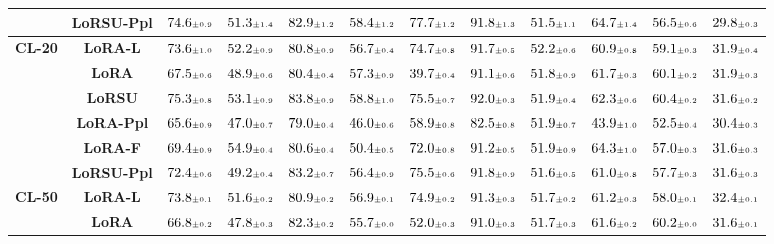 \begin{table}
\begin{center}
\begin{small}
\begin{tabular}{l c c c c c c c c c c c}
& \textbf{LoRSU-Ppl} & $74.6 \mtiny{\pm 0.9}$ & $51.3 \mtiny{\pm 1.4}$ & $82.9 \mtiny{\pm 1.2}$ & $58.4 \mtiny{\pm 1.2}$ & $77.7 \mtiny{\pm 1.2}$ & $91.8 \mtiny{\pm 1.3}$ & $51.5 \mtiny{\pm 1.1}$ & $64.7 \mtiny{\pm 1.4}$ & $56.5 \mtiny{\pm 0.6}$ & $29.8 \mtiny{\pm 0.3}$ \\
\midrule
\multirow{6}{*}{\textbf{CL-20}} & \textbf{LoRA-L} & $73.6 \mtiny{\pm 1.0}$ & $52.2 \mtiny{\pm 0.9}$ & $80.8 \mtiny{\pm 0.9}$ & $56.7 \mtiny{\pm 0.4}$ & $74.7 \mtiny{\pm 0.8}$ & $91.7 \mtiny{\pm 0.5}$ & $52.2 \mtiny{\pm 0.6}$ & $60.9 \mtiny{\pm 0.8}$ & $59.1 \mtiny{\pm 0.3}$ & $31.9 \mtiny{\pm 0.4}$ \\
& \textbf{LoRA} & $67.5 \mtiny{\pm 0.6}$ & $48.9 \mtiny{\pm 0.6}$ & $80.4 \mtiny{\pm 0.4}$ & $57.3 \mtiny{\pm 0.9}$ & $39.7 \mtiny{\pm 0.4}$ & $91.1 \mtiny{\pm 0.6}$ & $51.8 \mtiny{\pm 0.9}$ & $61.7 \mtiny{\pm 0.3}$ & $60.1 \mtiny{\pm 0.2}$ & $31.9 \mtiny{\pm 0.3}$ \\
& \textbf{LoRSU} & $75.3 \mtiny{\pm 0.8}$ & $53.1 \mtiny{\pm 0.9}$ & $83.8 \mtiny{\pm 0.9}$ & $58.8 \mtiny{\pm 1.0}$ & $75.5 \mtiny{\pm 0.7}$ & $92.0 \mtiny{\pm 0.3}$ & $51.9 \mtiny{\pm 0.4}$ & $62.3 \mtiny{\pm 0.6}$ & $60.4 \mtiny{\pm 0.2}$ & $31.6 \mtiny{\pm 0.2}$ \\
& \textbf{LoRA-Ppl} & $65.6 \mtiny{\pm 0.9}$ & $47.0 \mtiny{\pm 0.7}$ & $79.0 \mtiny{\pm 0.4}$ & $46.0 \mtiny{\pm 0.6}$ & $58.9 \mtiny{\pm 0.8}$ & $82.5 \mtiny{\pm 0.8}$ & $51.9 \mtiny{\pm 0.7}$ & $43.9 \mtiny{\pm 1.0}$ & $52.5 \mtiny{\pm 0.4}$ & $30.4 \mtiny{\pm 0.3}$ \\
& \textbf{LoRA-F} & $69.4 \mtiny{\pm 0.9}$ & $54.9 \mtiny{\pm 0.4}$ & $80.6 \mtiny{\pm 0.4}$ & $50.4 \mtiny{\pm 0.5}$ & $72.0 \mtiny{\pm 0.8}$ & $91.2 \mtiny{\pm 0.5}$ & $51.9 \mtiny{\pm 0.9}$ & $64.3 \mtiny{\pm 1.0}$ & $57.0 \mtiny{\pm 0.3}$ & $31.6 \mtiny{\pm 0.3}$ \\
& \textbf{LoRSU-Ppl} & $72.4 \mtiny{\pm 0.6}$ & $49.2 \mtiny{\pm 0.4}$ & $83.2 \mtiny{\pm 0.7}$ & $56.4 \mtiny{\pm 0.9}$ & $75.5 \mtiny{\pm 0.6}$ & $91.8 \mtiny{\pm 0.9}$ & $51.6 \mtiny{\pm 0.5}$ & $61.0 \mtiny{\pm 0.8}$ & $57.7 \mtiny{\pm 0.3}$ & $31.6 \mtiny{\pm 0.3}$ \\
\midrule
\multirow{6}{*}{\textbf{CL-50}} & \textbf{LoRA-L} & $73.8 \mtiny{\pm 0.1}$ & $51.6 \mtiny{\pm 0.2}$ & $80.9 \mtiny{\pm 0.2}$ & $56.9 \mtiny{\pm 0.1}$ & $74.9 \mtiny{\pm 0.2}$ & $91.3 \mtiny{\pm 0.3}$ & $51.7 \mtiny{\pm 0.2}$ & $61.2 \mtiny{\pm 0.3}$ & $58.0 \mtiny{\pm 0.1}$ & $32.4 \mtiny{\pm 0.1}$ \\
& \textbf{LoRA} & $66.8 \mtiny{\pm 0.2}$ & $47.8 \mtiny{\pm 0.3}$ & $82.3 \mtiny{\pm 0.2}$ & $55.7 \mtiny{\pm 0.0}$ & $52.0 \mtiny{\pm 0.3}$ & $91.0 \mtiny{\pm 0.3}$ & $51.7 \mtiny{\pm 0.3}$ & $61.6 \mtiny{\pm 0.2}$ & $60.2 \mtiny{\pm 0.0}$ & $31.6 \mtiny{\pm 0.1}$ \\

\end{tabular}
\end{small}
\end{center}
\end{table}
